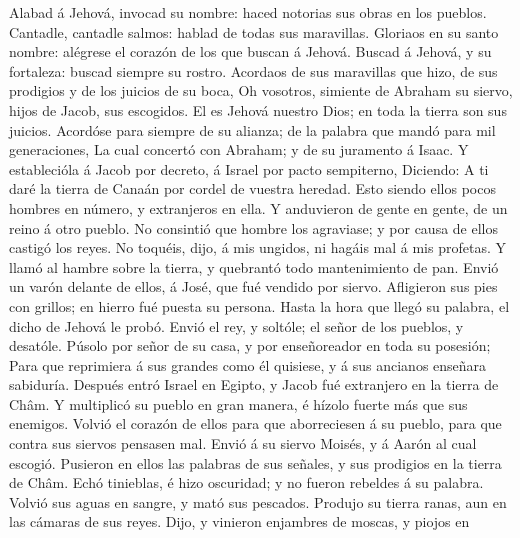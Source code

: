  Alabad á Jehová, invocad su nombre: haced notorias sus
obras en los pueblos.  Cantadle, cantadle salmos: hablad
de todas sus maravillas.  Gloriaos en su santo nombre:
alégrese el corazón de los que buscan á Jehová.  Buscad á
Jehová, y su fortaleza: buscad siempre su rostro. 
Acordaos de sus maravillas que hizo, de sus prodigios y de los juicios
de su boca,  Oh vosotros, simiente de Abraham su siervo,
hijos de Jacob, sus escogidos.  El es Jehová nuestro Dios;
en toda la tierra son sus juicios.  Acordóse para siempre
de su alianza; de la palabra que mandó para mil generaciones,
 La cual concertó con Abraham; y de su juramento á Isaac.
 Y establecióla á Jacob por decreto, á Israel por pacto
sempiterno,  Diciendo: A ti daré la tierra de Canaán por
cordel de vuestra heredad.  Esto siendo ellos pocos
hombres en número, y extranjeros en ella.  Y anduvieron
de gente en gente, de un reino á otro pueblo.  No
consintió que hombre los agraviase; y por causa de ellos castigó los
reyes.  No toquéis, dijo, á mis ungidos, ni hagáis mal á
mis profetas.  Y llamó al hambre sobre la tierra, y
quebrantó todo mantenimiento de pan.  Envió un varón
delante de ellos, á José, que fué vendido por siervo. 
Afligieron sus pies con grillos; en hierro fué puesta su persona.
 Hasta la hora que llegó su palabra, el dicho de Jehová
le probó.  Envió el rey, y soltóle; el señor de los
pueblos, y desatóle.  Púsolo por señor de su casa, y por
enseñoreador en toda su posesión;  Para que reprimiera á
sus grandes como él quisiese, y á sus ancianos enseñara sabiduría.
 Después entró Israel en Egipto, y Jacob fué extranjero
en la tierra de Châm.  Y multiplicó su pueblo en gran
manera, é hízolo fuerte más que sus enemigos.  Volvió el
corazón de ellos para que aborreciesen á su pueblo, para que contra sus
siervos pensasen mal.  Envió á su siervo Moisés, y á
Aarón al cual escogió.  Pusieron en ellos las palabras de
sus señales, y sus prodigios en la tierra de Châm.  Echó
tinieblas, é hizo oscuridad; y no fueron rebeldes á su palabra.
 Volvió sus aguas en sangre, y mató sus pescados.
 Produjo su tierra ranas, aun en las cámaras de sus
reyes.  Dijo, y vinieron enjambres de moscas, y piojos en
